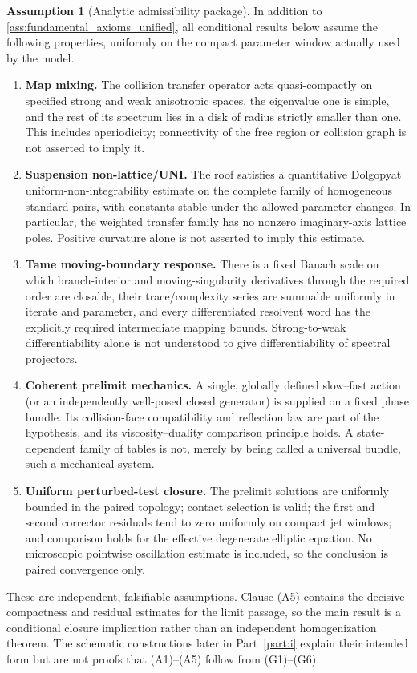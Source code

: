 \documentclass[12pt, letterpaper]{amsart}
\theoremstyle{plain}
\theoremstyle{definition}
\newtheorem{assumption}[theorem]{Assumption}
\theoremstyle{remark}
\begin{document}
\begin{assumption}[Analytic admissibility package]
\label{ass:analytic_admissibility_package}
In addition to \cref{ass:fundamental_axioms_unified}, all conditional results
below assume the following properties, uniformly on the compact parameter
window actually used by the model.
\begin{enumerate}[label=(A\arabic*), wide, labelindent=0pt]
    \item \textbf{Map mixing.}  The collision transfer operator acts
    quasi-compactly on specified strong and weak anisotropic spaces, the
    eigenvalue one is simple, and the rest of its spectrum lies in a disk of
    radius strictly smaller than one.  This includes aperiodicity; connectivity
    of the free region or collision graph is not asserted to imply it.
    \item \textbf{Suspension non-lattice/UNI.}  The roof satisfies a
    quantitative Dolgopyat uniform-non-integrability estimate on the complete
    family of homogeneous standard pairs, with constants stable under the
    allowed parameter changes.  In particular, the weighted transfer family
    has no nonzero imaginary-axis lattice poles.  Positive curvature alone is
    not asserted to imply this estimate.
    \item \textbf{Tame moving-boundary response.}  There is a fixed Banach
    scale on which branch-interior and moving-singularity derivatives through
    the required order are closable, their trace/complexity series are
    summable uniformly in iterate and parameter, and every differentiated
    resolvent word has the explicitly required intermediate mapping bounds.
    Strong-to-weak differentiability alone is not understood to give
    differentiability of spectral projectors.
    \item \textbf{Coherent prelimit mechanics.}  A single, globally defined
    slow--fast action (or an independently well-posed closed generator) is
    supplied on a fixed phase bundle.  Its collision-face compatibility and
    reflection law are part of the hypothesis, and its viscosity--duality
    comparison principle holds.  A state-dependent family of tables is not,
    merely by being called a universal bundle, such a mechanical system.
    \item \textbf{Uniform perturbed-test closure.} The prelimit solutions
    are uniformly bounded in the paired topology; contact selection is valid;
    the first and second corrector residuals tend to zero uniformly on compact
    jet windows; and comparison holds for the effective degenerate elliptic
    equation.  No microscopic pointwise oscillation estimate is included, so
    the conclusion is paired convergence only.
\end{enumerate}
These are independent, falsifiable assumptions. Clause \textup{(A5)} contains
the decisive compactness and residual estimates for the limit passage, so the
main result is a conditional closure implication rather than an independent
homogenization theorem. The schematic constructions later in Part~\ref{part:i}
explain their intended form but are not proofs that
\textup{(A1)--(A5)} follow from \textup{(G1)--(G6)}.


\end{assumption}
\end{document}
